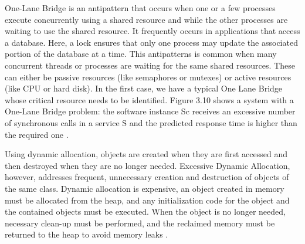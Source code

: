 \documentclass[espaco=umemeio,chapter=TITLE,twoside,openright]{abnt}
\begin{document}
One-Lane Bridge is an antipattern that occurs when one or a few processes execute concurrently using a shared resource and while the other processes are waiting to use the shared resource. It frequently occurs in applications that access a database. Here, a lock ensures that only one process may update the associated portion of the database at a time. This antipatterns is common when many concurrent threads or processes are waiting for the same shared resources. These can either be passive resources (like semaphores or mutexes) or active resources (like CPU or hard disk). In the first case, we have a typical One Lane Bridge whose critical resource needs to be identified. Figure 3.10 shows a system with a One-Lane Bridge problem:  the software instance Sc receives an excessive number of synchronous calls in a service S and the predicted response time is higher than the required one \cite{Vetoio2011}.


Using dynamic allocation, objects are created when they are first accessed and then destroyed when they are no longer needed. Excessive Dynamic Allocation, however, addresses frequent, unnecessary creation and destruction of objects of the same class. Dynamic allocation is expensive, an object created in memory must be allocated from the heap, and any initialization code for the object and the contained objects must be executed. When the object is no longer needed, necessary clean-up must be performed, and the reclaimed memory must be returned to the heap to avoid memory leaks \cite{Smith2002} \cite{Smith2003}.
\end{document}
